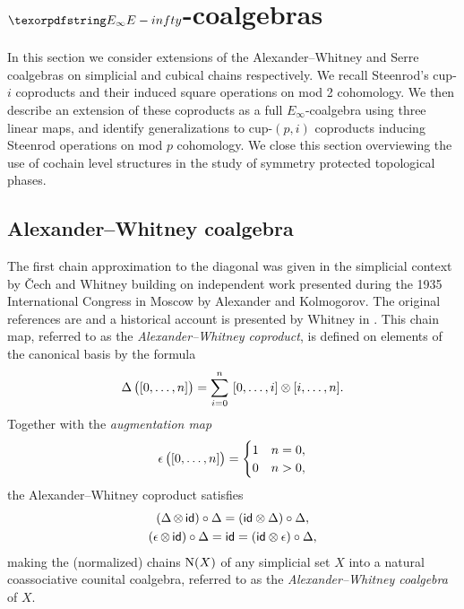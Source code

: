 
\section{$\pdfEinfty$-coalgebras} \label{s:integrally}

In this section we consider extensions of the Alexander--Whitney and Serre coalgebras on simplicial and cubical chains respectively.
We recall Steenrod's cup-$i$ coproducts and their induced square operations on mod 2 cohomology.
We then describe an extension of these coproducts as a full $E_\infty$-coalgebra using three linear maps, and identify generalizations to cup-$(p,i)$ coproducts inducing Steenrod operations on mod $p$ cohomology.
We close this section overviewing the use of cochain level structures in the study of symmetry protected topological phases.

\subsection{Alexander--Whitney coalgebra} \label{ss:aw diagonal}

The first chain approximation to the diagonal was given in the simplicial context by \v{C}ech and Whitney building on independent work presented during the 1935 International Congress in Moscow by Alexander and Kolmogorov.
The original references are \cite{alexander1936ring, cech1936multiplication, whitney1938products} and a historical account is presented by Whitney in \cite[p.110]{whitney1988history}.
This chain map, referred to as the \textit{Alexander--Whitney coproduct}, is defined on elements of the canonical basis by the formula
\begin{equation} \label{e:alexander-whitney coalgebra}
\operatorname{\Delta} \big( [0,\dots,n] \big) = \sum_{i=0}^n \ [0, \dots, i] \otimes [i, \dots, n].
\end{equation}
Together with the \textit{augmentation map}
\begin{equation} \label{e:augmentation map}
\operatorname{\epsilon} \big( [0, \dots, n] \big) =
\begin{cases}
1 & n = 0, \\
0 & n > 0,
\end{cases}
\end{equation}
the Alexander--Whitney coproduct satisfies
\begin{gather}
\label{e:coassociativity relation}
(\operatorname{\Delta} \otimes \, \mathsf{id}) \circ \operatorname{\Delta} = (\mathsf{id} \otimes \operatorname{\Delta}) \circ \operatorname{\Delta}, \\
\label{e:counital relation}
(\operatorname{\epsilon} \otimes \, \mathsf{id}) \circ \operatorname{\Delta} = \mathsf{id} = (\mathsf{id} \otimes \operatorname{\epsilon}) \circ \operatorname{\Delta},
\end{gather}
making the (normalized) chains $\operatorname{N}(X)$ of any simplicial set $X$ into a natural coassociative counital coalgebra, referred to as the \textit{Alexander--Whitney coalgebra} of $X$.


